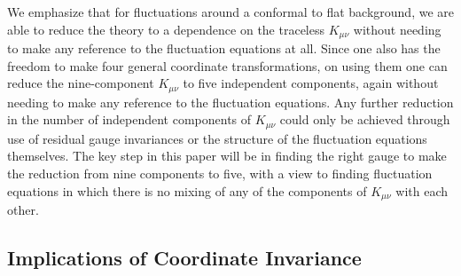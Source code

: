 \documentclass[aps]{revtex4}
\begin{document}
We emphasize that for fluctuations around a conformal to flat background, we are able to reduce the theory to a dependence on the traceless $K_{\mu\nu}$ without needing to make any reference to the fluctuation equations at all. Since one also has the freedom to make four general coordinate transformations, on using them one can reduce  the nine-component $K_{\mu\nu}$ to five independent components, again without needing to make any reference to the fluctuation equations. Any further reduction in the number of independent components of $K_{\mu\nu}$ could only be achieved through use of residual gauge invariances or the structure of the fluctuation equations themselves. The key step in this paper will be in finding the right gauge to make the reduction from nine components to five, with a view to finding fluctuation equations in which there is no mixing of any of the components of $K_{\mu\nu}$ with each other.

\subsection{Implications of Coordinate Invariance}
\end{document}

